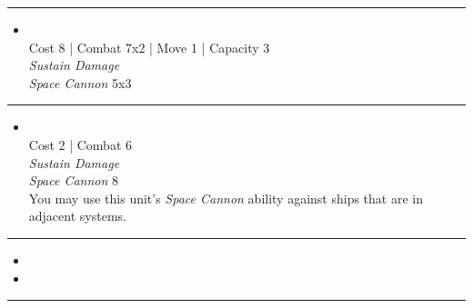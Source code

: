 \begin{multicols}{2}
\vspace{-10pt}\rule{\hsize}{0.4pt}\vspace{5pt}


\begin{itemize}
\item {}\\
Cost 8 | Combat 7x2 | Move 1 | Capacity 3 \\
\emph{Sustain Damage}\\
\emph{Space Cannon} 5x3
\end{itemize}

\vspace{-10pt}\rule{\hsize}{0.4pt}\vspace{5pt}


\begin{itemize}
\item {}
\\
Cost 2 | Combat 6 \\
\emph{Sustain Damage}\\
\emph{Space Cannon} 8\\
You may use this unit's \emph{Space Cannon} ability against ships that are in adjacent systems.
\end{itemize}

\vspace{-10pt}\rule{\hsize}{0.4pt}\vspace{5pt}

\nounits

\columnbreak
{}

\begin{itemize}
\item \instinct
\item \nullification
\end{itemize}

\vspace{-10pt}\rule{\hsize}{0.4pt}\vspace{5pt}



\end{multicols}
